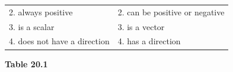 {{\begin{center}
\begin{tabular}[t]{|l|l|}
    
        2. always positive &
    
    
        2. can be positive or negative%
     \tabularnewline\cline{1-1}\cline{2-2}
    
    
        3. is a scalar &
    
    
        3. is a vector%
     \tabularnewline\cline{1-1}\cline{2-2}
    
    
        4. does not have a direction &
    
    
        4. has a direction%
     \tabularnewline\cline{1-1}\cline{2-2}
    \end{tabular}
      \end{center}
    \begin{center}{\small\bfseries Table 20.1}\end{center}
    
    \addtocounter{footnote}{-0}
    
}}
